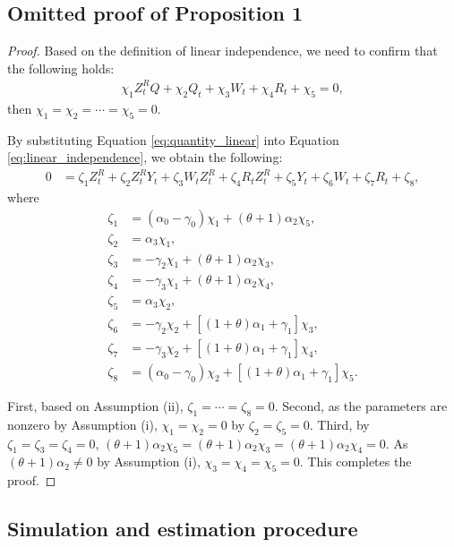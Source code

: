 \documentclass[11pt, a4paper]{article}
\begin{document}
\subsection{Omitted proof of Proposition 1}
\begin{proof}
    Based on the definition of linear independence, we need to confirm that the following holds:
\begin{align}
    \chi_1 Z_{t}^R Q + \chi_2 Q_{t} + \chi_3 W_{t} + \chi_4 R_{t} + \chi_5 = 0, \label{eq:linear_independence}
\end{align}
then $\chi_1 = \chi_2 = \cdots = \chi_5 = 0$.

By substituting Equation \eqref{eq:quantity_linear} into Equation \eqref{eq:linear_independence}, we obtain the following:
\begin{align*}
    0 &= \zeta_1 Z_{t}^R + \zeta_2 Z_{t}^RY_{t} + \zeta_3 W_{t}Z_{t}^R + \zeta_4 R_{t}Z_{t}^R + \zeta_5 Y_{t} + \zeta_6 W_{t} + \zeta_7 R_{t} + \zeta_8, 
\end{align*}
where 
\begin{align*}
    \zeta_1 &= (\alpha_0 - \gamma_0)\chi_1  + (\theta +1 )\alpha_2 \chi_5 ,\\
    \zeta_2 &= \alpha_3\chi_1,\\
    \zeta_3 &= -\gamma_2 \chi_1 + (\theta + 1)\alpha_2\chi_3,\\
    \zeta_4 &= -\gamma_3 \chi_1 + (\theta + 1)\alpha_2\chi_4,\\
    \zeta_5 &=  \alpha_3\chi_2,\\
    \zeta_6 &= -\gamma_2 \chi_2 + [(1 + \theta) \alpha_1 +\gamma_1]\chi_3,\\
    \zeta_7 &= -\gamma_3 \chi_2 +  [(1 + \theta) \alpha_1 +\gamma_1]\chi_4,\\
    \zeta_8 &=  (\alpha_0 - \gamma_0)\chi_2 +[(1 + \theta)\alpha_1 +\gamma_1] \chi_5.
\end{align*}

First, based on Assumption (ii), $\zeta_1 = \cdots = \zeta_8 = 0$.
Second, as the parameters are nonzero by Assumption (i), $\chi_1 = \chi_2 =0$ by $\zeta_2 = \zeta_5 = 0$.
Third, by $\zeta_1 = \zeta_3 = \zeta_4 = 0$, $(\theta + 1 )\alpha_2\chi_5 = (\theta + 1 )\alpha_2\chi_3 = (\theta + 1 )\alpha_2\chi_4 = 0.$
As $(\theta + 1)\alpha_2 \ne 0$ by Assumption (i), $\chi_3 = \chi_4 = \chi_5 = 0$.
This completes the proof.
\end{proof}

\subsection{Simulation and estimation procedure}
\end{document}
